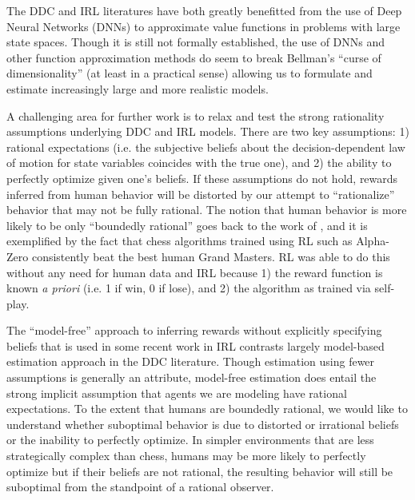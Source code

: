 The DDC and IRL literatures have both greatly benefitted from the use of Deep Neural Networks (DNNs) to 
approximate value functions in problems with large state spaces. Though it is still not
formally established, the use of DNNs and other function
approximation  methods do seem to break Bellman's ``curse of dimensionality'' (at least in a practical sense) 
allowing us to formulate and estimate increasingly large and more realistic models.

A challenging area for further work is to relax and test the strong rationality assumptions underlying
DDC and IRL models. There are two key assumptions: 1) rational expectations (i.e. the subjective
beliefs about the decision-dependent law of motion for state variables coincides with the true one), and 2) the 
ability to perfectly optimize given one's beliefs. If these
assumptions do not hold, rewards inferred from human behavior will be distorted by our attempt to ``rationalize'' 
behavior that may not be fully rational. The notion that human behavior is more likely to be only ``boundedly rational''
goes back to the work of \citet{Simon:1957}, and it is exemplified by the fact that chess algorithms trained using RL 
such as Alpha-Zero consistently beat the best human Grand Masters. 
RL was able to do this without any need for human data and IRL
 because 1) the reward function is known {\it a priori\/} (i.e. 1 if win, 0 if lose), and 
2) the algorithm as trained via self-play.

The ``model-free'' approach to inferring rewards without explicitly
specifying beliefs that is used in some recent work in IRL contrasts largely model-based 
estimation approach in the DDC literature. Though estimation using fewer assumptions
is generally an attribute, model-free estimation does entail the strong implicit assumption that
agents we are modeling have rational expectations.  To the extent that humans are boundedly rational,
we would like to understand whether suboptimal behavior is due to distorted or irrational
beliefs or the inability to perfectly optimize.  In simpler environments that are less strategically complex than
chess, humans may be more likely to perfectly optimize but if their beliefs are not rational, 
the resulting behavior will  still be suboptimal from the standpoint of a rational observer.

